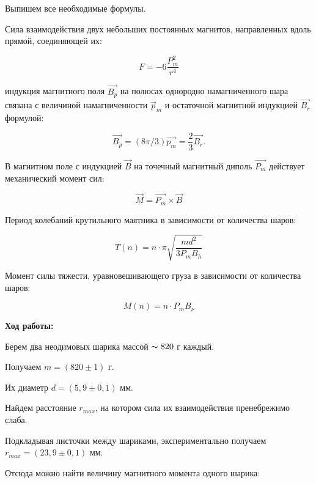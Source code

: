 \documentclass[a4paper,12pt]{article} %
\begin{document}
Выпишем все необходимые формулы.

Сила взаимодействия двух небольших постоянных магнитов, направленных вдоль прямой, соединяющей их:

\begin{equation*}
	F = -6\frac{P_m^2}{r^4}
\end{equation*}

индукция магнитного поля $\overrightarrow{B_p}$ на полюсах однородно намагниченного шара связана с величиной намагниченности $\overrightarrow{p}_m$ и остаточной магнитной индукцией $\overrightarrow{B_r}$ формулой:

\begin{equation*}
	\overrightarrow{B_p} = (8\pi /3)\overrightarrow{p_m} = \frac{2}{3}\overrightarrow{B_r}.
\end{equation*}


В магнитном поле с индукцией $\overrightarrow{B}$ на точечный магнитный диполь $\overrightarrow{P_m}$ действует механический момент сил:

\begin{equation*}
	\overrightarrow{M} = \overrightarrow{P_m} \times \overrightarrow{B}
\end{equation*}

Период колебаний крутильного маятника в зависимости от количества шаров:

\begin{equation*}
	T(n) = n \cdot \pi\sqrt{\frac{md^2}{3P_mB_h}}
\end{equation*}

Момент силы тяжести, уравновешивающего груза в зависимости от количества шаров:

\begin{equation*}
	M(n) = n \cdot P_mB_{\nu}
\end{equation*}


\newpage
\textbf{Ход работы:}

\vspace{5mm}
Берем два неодимовых шарика массой $\thicksim 820$ г каждый.

Получаем $m = (820 \pm 1)$ г.

Их диаметр $d = (5,9 \pm 0,1)$ мм.

Найдем расстояние $r_{max}$, на котором сила их взаимодействия пренебрежимо слаба.

Подкладывая листочки между шариками, экспериментально получаем $r_{max} = (23,9 \pm 0,1)$ мм.

Отсюда можно найти величину магнитного момента одного шарика:
\end{document}
